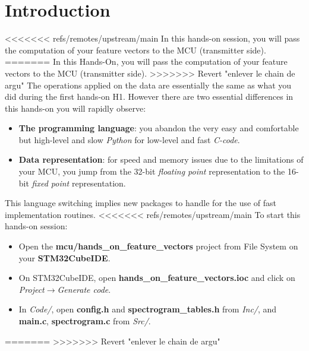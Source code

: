\section*{Introduction}
%
<<<<<<< refs/remotes/upstream/main
In this hands-on session, you will pass the computation of your feature vectors to the MCU (transmitter side).
=======
In this Hands-On, you will pass the computation of your feature vectors to the MCU (transmitter side).
>>>>>>> Revert "enlever le chain de argu"
The operations applied on the data are essentially the same as what you did during the first hands-on H1.
However there are two essential differences in this hands-on you will rapidly observe:
\begin{itemize}
    \item \textbf{The programming language}: you abandon the very easy and comfortable but high-level and slow \emph{Python} for low-level and fast \emph{C-code}.
    \item \textbf{Data representation}: for speed and memory issues due to the limitations of your MCU, you jump from the 32-bit \emph{floating point} representation to the 16-bit \emph{fixed point} representation.
\end{itemize}
%
This language switching implies new packages to handle for the use of fast implementation routines.
<<<<<<< refs/remotes/upstream/main
To start this hands-on session:
\begin{itemize}
    \item Open the \textbf{mcu/hands\_on\_feature\_vectors} project from File System on your \textbf{STM32CubeIDE}. 
    \item On STM32CubeIDE, open \textbf{hands\_on\_feature\_vectors.ioc} and click on \emph{Project$\rightarrow$Generate code}.
    \item In \emph{Code/}, open \textbf{config.h} and \textbf{spectrogram\_tables.h} from \emph{Inc/}, and \textbf{main.c}, \textbf{spectrogram.c} from \emph{Src/}.
\end{itemize}
=======
%
%
%
>>>>>>> Revert "enlever le chain de argu"
